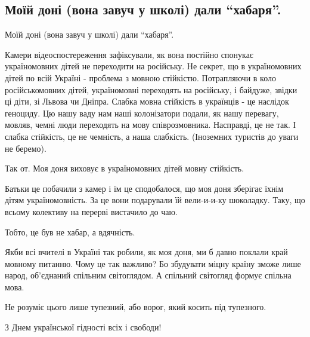  
 
 
 
 
 
\subsection{Моїй доні (вона завуч у школі) дали \enquote{хабаря}.}
\label{sec:21_11_2020.fb.nitsoi_larysa.1.mova_habar}

Моїй доні (вона завуч у школі) дали \enquote{хабаря}.

Камери відеоспостереження зафіксували, як вона постійно спонукає україномовних
дітей не переходити на російську. Не секрет, що в україномовних дітей по всій
Україні - проблема з мовною стійкістю. Потрапляючи в коло російськомовних
дітей, україномовні переходять на російську, і байдуже, звідки ці діти, зі
Львова чи Дніпра. Слабка мовна стійкість в українців - це наслідок геноциду. Цю
нашу ваду нам наші колонізатори подали, як нашу перевагу, мовляв, чемні люди
переходять на мову співрозмовника. Насправді, це не так. І слабка стійкість, це
не чемність, а наша слабкість. (Іноземних туристів до уваги не беремо).

Так от. Моя доня виховує в україномовних дітей мовну стійкість.

Батьки це побачили з камер і їм це сподобалося, що моя доня зберігає їхнім
дітям україномовність. За це вони подарували їй вели-и-и-ку шоколадку. Таку, що
всьому колективу на перерві вистачило до чаю.  

Тобто, це був не хабар, а вдячність.  

Якби всі вчителі в Україні так робили, як моя доня, ми б давно поклали край
мовному питанню. Чому це так важливо? Бо збудувати міцну країну зможе лише
народ, об'єднаний спільним світоглядом. А спільний світогляд формує спільна
мова.  

Не розуміє цього лише тупезний, або ворог, який косить під тупезного. 

З Днем української гідності всіх і свободи!

